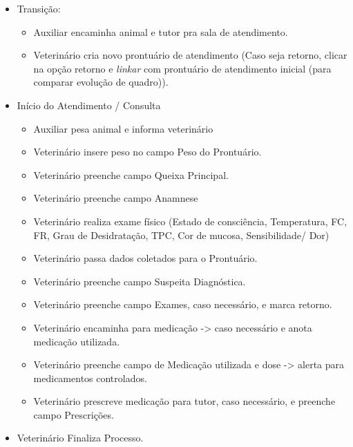 \documentclass[
    12pt,               %
    openright,          %
    oneside,
    a4paper,            %
    BIBLATEX,           %
    TODO,               %
    english,            %
    brazil              %
    ]{ifsp-spo-inf-ctds}
\begin{document}
		
    \begin{itemize}
        \item Transição:
            \begin{itemize}
                \item Auxiliar encaminha animal e tutor pra sala de atendimento.
                \item Veterinário cria novo prontuário de atendimento (Caso seja retorno, clicar na opção retorno e \emph{linkar} com prontuário de atendimento inicial (para comparar evolução de quadro)).
            \end{itemize}
    \end{itemize}

    \begin{itemize}
        \item Início do Atendimento / Consulta 

        \begin{itemize}
            \item Auxiliar pesa animal e informa veterinário
            \item Veterinário insere peso no campo Peso do Prontuário.
            \item Veterinário preenche campo Queixa Principal.
            \item Veterinário preenche campo Anamnese 
            \item Veterinário realiza exame físico (Estado de consciência, Temperatura, FC, FR, Grau de Desidratação, TPC, Cor de mucosa, Sensibilidade/ Dor)
            \item Veterinário passa dados coletados para o Prontuário.
            \item Veterinário preenche campo Suspeita Diagnóstica.
            \item Veterinário preenche campo Exames, caso necessário, e marca retorno.
            \item Veterinário encaminha para medicação -> caso necessário e anota medicação utilizada.
            \item Veterinário preenche campo de Medicação utilizada e dose -> alerta para medicamentos controlados.
            \item Veterinário prescreve medicação para tutor, caso necessário, e preenche campo Prescrições.
                        
        \end{itemize}
        \item Veterinário Finaliza Processo.
    \end{itemize}
\end{document}
